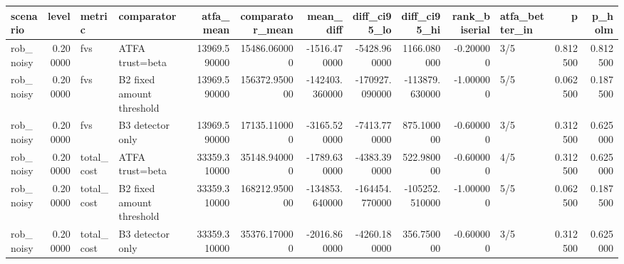 \begin{tabular}{lrllrrrrrrlrr}
\toprule
scenario & level & metric & comparator & atfa\_mean & comparator\_mean & mean\_diff & diff\_ci95\_lo & diff\_ci95\_hi & rank\_biserial & atfa\_better\_in & p & p\_holm \\
\midrule
rob\_noisy & 0.200000 & fvs & ATFA trust=beta & 13969.590000 & 15486.060000 & -1516.470000 & -5428.960000 & 1166.080000 & -0.200000 & 3/5 & 0.812500 & 0.812500 \\
rob\_noisy & 0.200000 & fvs & B2 fixed amount threshold & 13969.590000 & 156372.950000 & -142403.360000 & -170927.090000 & -113879.630000 & -1.000000 & 5/5 & 0.062500 & 0.187500 \\
rob\_noisy & 0.200000 & fvs & B3 detector only & 13969.590000 & 17135.110000 & -3165.520000 & -7413.770000 & 875.100000 & -0.600000 & 3/5 & 0.312500 & 0.625000 \\
rob\_noisy & 0.200000 & total\_cost & ATFA trust=beta & 33359.310000 & 35148.940000 & -1789.630000 & -4383.390000 & 522.980000 & -0.600000 & 4/5 & 0.312500 & 0.625000 \\
rob\_noisy & 0.200000 & total\_cost & B2 fixed amount threshold & 33359.310000 & 168212.950000 & -134853.640000 & -164454.770000 & -105252.510000 & -1.000000 & 5/5 & 0.062500 & 0.187500 \\
rob\_noisy & 0.200000 & total\_cost & B3 detector only & 33359.310000 & 35376.170000 & -2016.860000 & -4260.180000 & 356.750000 & -0.600000 & 3/5 & 0.312500 & 0.625000 \\
\bottomrule
\end{tabular}
